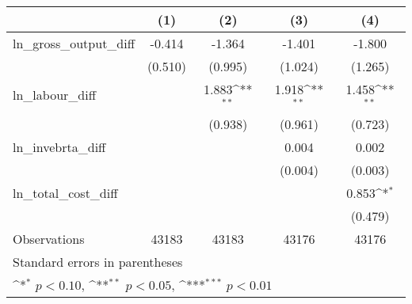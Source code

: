 {
\def\sym#1{\ifmmode^{#1}\else\(^{#1}\)\fi}
\begin{tabular}{l*{4}{c}}
\hline\hline
                &\multicolumn{1}{c}{(1)}         &\multicolumn{1}{c}{(2)}         &\multicolumn{1}{c}{(3)}         &\multicolumn{1}{c}{(4)}         \\
\hline
ln\_gross\_output\_diff&   -0.414         &   -1.364         &   -1.401         &   -1.800         \\
                &  (0.510)         &  (0.995)         &  (1.024)         &  (1.265)         \\
[1em]
ln\_labour\_diff  &                  &    1.883\sym{**} &    1.918\sym{**} &    1.458\sym{**} \\
                &                  &  (0.938)         &  (0.961)         &  (0.723)         \\
[1em]
ln\_invebrta\_diff&                  &                  &    0.004         &    0.002         \\
                &                  &                  &  (0.004)         &  (0.003)         \\
[1em]
ln\_total\_cost\_diff&                  &                  &                  &    0.853\sym{*}  \\
                &                  &                  &                  &  (0.479)         \\
\hline
Observations    &    43183         &    43183         &    43176         &    43176         \\
\hline\hline
\multicolumn{5}{l}{\footnotesize Standard errors in parentheses}\\
\multicolumn{5}{l}{\footnotesize \sym{*} \(p<0.10\), \sym{**} \(p<0.05\), \sym{***} \(p<0.01\)}\\
\end{tabular}
}
